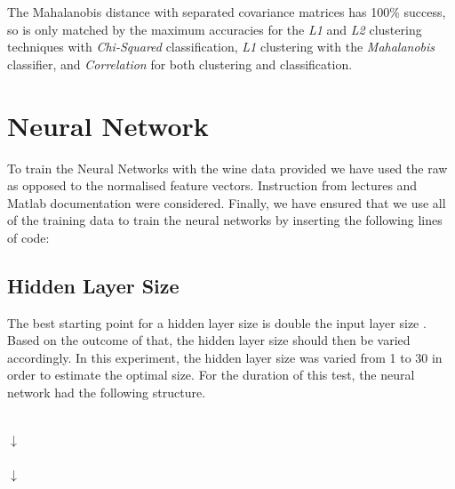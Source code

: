 \documentclass[10pt,twocolumn,letterpaper]{article}
\begin{document}
The Mahalanobis distance with separated covariance matrices has 100\% success, so is only matched by the maximum accuracies for the \textit{L1} and \textit{L2} clustering techniques with \textit{Chi-Squared} classification, \textit{L1} clustering with the \textit{Mahalanobis} classifier, and \textit{Correlation} for both clustering and classification.

\section{Neural Network}

To train the Neural Networks with the wine data provided we have used the raw as opposed to the normalised feature vectors. Instruction from lectures and Matlab documentation \cite{MatlabWine} were considered.  Finally, we have ensured that we use all of the training data to train the neural networks by inserting the following lines of code:

\begin{center}
\end{center}


\subsection{Hidden Layer Size}
The best starting point for a hidden layer size is double the input layer size \cite{NN_Java}. Based on the outcome of that, the hidden layer size should then be varied accordingly. In this experiment, the hidden layer size was varied from 1 to 30 in order to estimate the optimal size. For the duration of this test, the neural network had the following structure.

\begin{center}
 \\

\centering
$\downarrow$ \\

\centering
{}\\

\centering
$\downarrow$\\

\centering
{}\\

\end{center}
\end{document}
